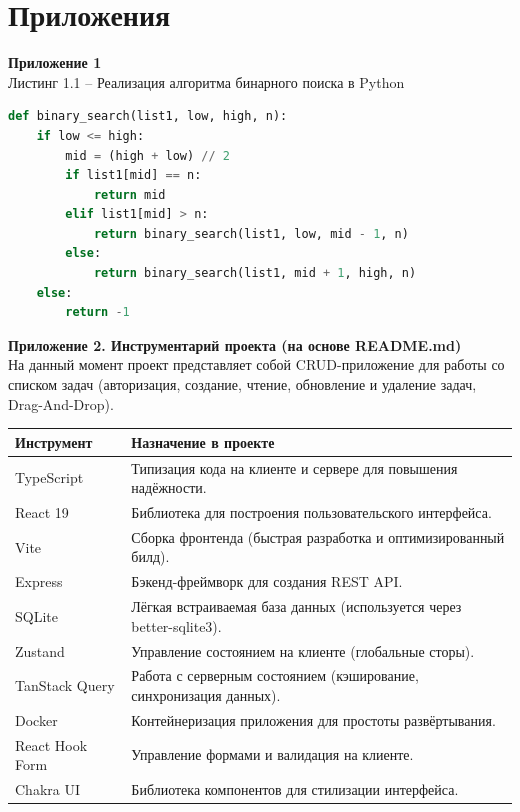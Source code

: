\documentclass[a4paper,14pt]{extarticle}
\begin{document}
\newpage
\section*{Приложения}

\textbf{Приложение 1}\\
Листинг 1.1 – Реализация алгоритма бинарного поиска в Python
\begin{lstlisting}[language=Python]
def binary_search(list1, low, high, n):
    if low <= high:
        mid = (high + low) // 2
        if list1[mid] == n:
            return mid
        elif list1[mid] > n:
            return binary_search(list1, low, mid - 1, n)
        else:
            return binary_search(list1, mid + 1, high, n)
    else:
        return -1
\end{lstlisting}

\vspace{1cm}
\textbf{Приложение 2. Инструментарий проекта (на основе README.md)}\\
На данный момент проект представляет собой CRUD-приложение для работы со списком задач (авторизация, создание, чтение, обновление и удаление задач, Drag-And-Drop).

\begin{table}[h]
\centering
\begin{tabularx}{\textwidth}{|l|X|}
\hline
\textbf{Инструмент} & \textbf{Назначение в проекте} \\
\hline
TypeScript & Типизация кода на клиенте и сервере для повышения надёжности. \\
\hline
React 19 & Библиотека для построения пользовательского интерфейса. \\
\hline
Vite & Сборка фронтенда (быстрая разработка и оптимизированный билд). \\
\hline
Express & Бэкенд-фреймворк для создания REST API. \\
\hline
SQLite & Лёгкая встраиваемая база данных (используется через better-sqlite3). \\
\hline
Zustand & Управление состоянием на клиенте (глобальные сторы). \\
\hline
TanStack Query & Работа с серверным состоянием (кэширование, синхронизация данных). \\
\hline
Docker & Контейнеризация приложения для простоты развёртывания. \\
\hline
React Hook Form & Управление формами и валидация на клиенте. \\
\hline
Chakra UI & Библиотека компонентов для стилизации интерфейса. \\
\hline
\end{tabularx}
\end{table}
\end{document}
